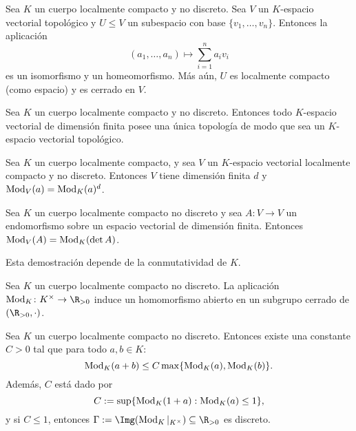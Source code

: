 \documentclass[teoria-numeros.tex]{subfiles}
\begin{document}
\begin{thm}
	Sea $K$ un cuerpo localmente compacto y no discreto.
	Sea $V$ un $K$-espacio vectorial topológico y $U \le V$ un subespacio con base $\{ v_1, \dots, v_n \}$.
	Entonces la aplicación
	$$ (a_1, \dots, a_n) \longmapsto \sum_{i=1}^{n} a_i v_i $$
	es un isomorfismo y un homeomorfismo.
	Más aún, $U$ es localmente compacto (como espacio) y es cerrado en $V$.
\end{thm}
\begin{cor}
	Sea $K$ un cuerpo localmente compacto y no discreto.
	Entonces todo $K$-espacio vectorial de dimensión finita posee una única topología de modo que sea un $K$-espacio vectorial topológico.
\end{cor}
\begin{cor}
	Sea $K$ un cuerpo localmente compacto, y sea $V$ un $K$-espacio vectorial localmente compacto y no discreto.
	Entonces $V$ tiene dimensión finita $d$ y $\operatorname{Mod}_V(a) = \operatorname{Mod}_K(a)^d$.
\end{cor}

\begin{cor}
	Sea $K$ un cuerpo localmente compacto no discreto y sea $A \colon V \to V$ un endomorfismo sobre un espacio vectorial de dimensión finita.
	Entonces $\operatorname{Mod}_V(A) = \operatorname{Mod}_K(\det A)$.
\end{cor}
\warn
Esta demostración depende de la conmutatividad de $K$.

\begin{prop}
	Sea $K$ un cuerpo localmente compacto no discreto.
	La aplicación $\Mod_K \colon K^\times \to \R_{> 0}$ induce un homomorfismo abierto en un subgrupo cerrado de $(\R_{> 0}, \cdot)$.
\end{prop}
\begin{thm}
	Sea $K$ un cuerpo localmente compacto no discreto.
	Entonces existe una constante $C > 0$ tal que para todo $a, b \in K$:
	$$ \operatorname{Mod}_K(a + b) \le C \max\{ \operatorname{Mod}_K(a), \operatorname{Mod}_K(b) \}. $$
	Además, $C$ está dado por
	$$ C := \sup\{ \operatorname{Mod}_K(1 + a) : \operatorname{Mod}_K(a) \le 1 \}, $$
	y si $C \le 1$, entonces $\Gamma := \Img( \Mod_K|_{K^\times} ) \subseteq \R_{> 0}$ es discreto.
\end{thm}
\end{document}
